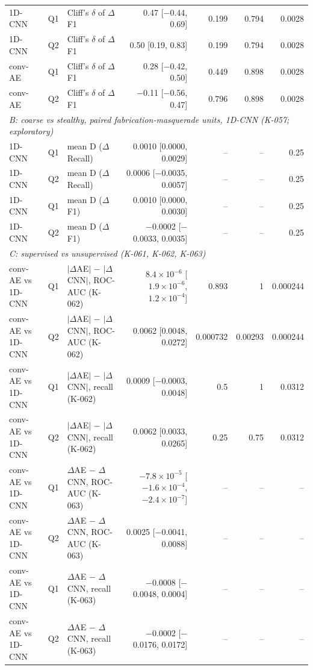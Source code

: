 \begin{table}[t]
\begin{tabular}{@{}lllrrrr@{}}
1D-CNN & Q1 & Cliff's $\delta$ of $\Delta$F1 & 0.47 [$-$0.44, 0.69] & 0.199 & 0.794 & 0.0028 \\
1D-CNN & Q2 & Cliff's $\delta$ of $\Delta$F1 & 0.50 [0.19, 0.83] & 0.199 & 0.794 & 0.0028 \\
conv-AE & Q1 & Cliff's $\delta$ of $\Delta$F1 & 0.28 [$-$0.42, 0.50] & 0.449 & 0.898 & 0.0028 \\
conv-AE & Q2 & Cliff's $\delta$ of $\Delta$F1 & $-$0.11 [$-$0.56, 0.47] & 0.796 & 0.898 & 0.0028 \\
\midrule
\multicolumn{7}{l}{\textit{B: coarse vs stealthy, paired fabrication-masquerade units, 1D-CNN (K-057; exploratory)}} \\
1D-CNN & Q1 & mean D ($\Delta$Recall) & 0.0010 [0.0000, 0.0029] & -- & -- & 0.25 \\
1D-CNN & Q2 & mean D ($\Delta$Recall) & 0.0006 [$-$0.0035, 0.0057] & -- & -- & 0.25 \\
1D-CNN & Q1 & mean D ($\Delta$F1) & 0.0010 [0.0000, 0.0030] & -- & -- & 0.25 \\
1D-CNN & Q2 & mean D ($\Delta$F1) & $-$0.0002 [$-$0.0033, 0.0035] & -- & -- & 0.25 \\
\midrule
\multicolumn{7}{l}{\textit{C: supervised vs unsupervised (K-061, K-062, K-063)}} \\
conv-AE vs 1D-CNN & Q1 & $|\Delta$AE$|$ $-$ $|\Delta$CNN$|$, ROC-AUC (K-062) & $8.4\times10^{-6}$ [$1.9\times10^{-6}$, $1.2\times10^{-4}$] & 0.893 & 1 & 0.000244 \\
conv-AE vs 1D-CNN & Q2 & $|\Delta$AE$|$ $-$ $|\Delta$CNN$|$, ROC-AUC (K-062) & 0.0062 [0.0048, 0.0272] & 0.000732 & 0.00293 & 0.000244 \\
conv-AE vs 1D-CNN & Q1 & $|\Delta$AE$|$ $-$ $|\Delta$CNN$|$, recall (K-062) & 0.0009 [$-$0.0003, 0.0048] & 0.5 & 1 & 0.0312 \\
conv-AE vs 1D-CNN & Q2 & $|\Delta$AE$|$ $-$ $|\Delta$CNN$|$, recall (K-062) & 0.0062 [0.0033, 0.0265] & 0.25 & 0.75 & 0.0312 \\
conv-AE vs 1D-CNN & Q1 & $\Delta$AE $-$ $\Delta$CNN, ROC-AUC (K-063) & $-7.8\times10^{-5}$ [$-1.6\times10^{-4}$, $-2.4\times10^{-7}$] & -- & -- & -- \\
conv-AE vs 1D-CNN & Q2 & $\Delta$AE $-$ $\Delta$CNN, ROC-AUC (K-063) & 0.0025 [$-$0.0041, 0.0088] & -- & -- & -- \\
conv-AE vs 1D-CNN & Q1 & $\Delta$AE $-$ $\Delta$CNN, recall (K-063) & $-$0.0008 [$-$0.0048, 0.0004] & -- & -- & -- \\
conv-AE vs 1D-CNN & Q2 & $\Delta$AE $-$ $\Delta$CNN, recall (K-063) & $-$0.0002 [$-$0.0176, 0.0172] & -- & -- & -- \\
\bottomrule
\end{tabular}
\end{table}
